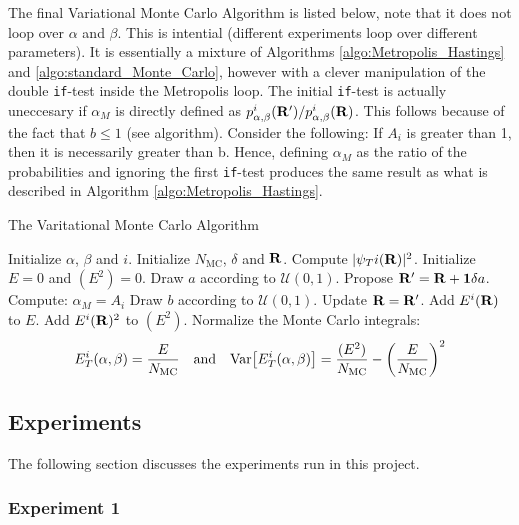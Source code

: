 \documentclass[nofootinbib,reprint,english]{revtex4-1}
\begin{document}
The final Variational Monte Carlo Algorithm is listed below, note that it does not loop over \(\alpha\) and \(\beta\). This is intential (different experiments loop over different parameters). It is essentially a mixture of Algorithms \ref{algo:Metropolis_Hastings} and \ref{algo:standard_Monte_Carlo}, however with a clever manipulation of the double \texttt{if}-test inside the Metropolis loop. The initial \texttt{if}-test is actually uneccesary if \(\alpha_M\) is directly defined as \(p_{\alpha,\beta}^i(\vb{R}')/p_{\alpha,\beta}^i(\vb{R})\). This follows because of the fact that \(b\leq1\) (see algorithm). Consider the following: If \(A_i\) is greater than 1, then it is necessarily greater than b. Hence, defining \(\alpha_M\) as the ratio of the probabilities and ignoring the first \texttt{if}-test produces the same result as what is described in Algorithm \ref{algo:Metropolis_Hastings}.

\begin{algorithm}[H]
\caption{The Varitational Monte Carlo Algorithm}\label{algo:Metropolis_Hastings}
\begin{algorithmic}[1]
\State Initialize \(\alpha\), \(\beta\) and \(i\).
\State Initialize \(N_\text{MC}\), \(\delta\) and \(\vb{R}\).
\State Compute \(|\psi_T i(\vb{R})|^2\).
\State Initialize \(E=0\) and \((E^2)=0\).
	\State Draw \(a\) according to \(\mathcal{U}(0,1)\).
	\State Propose \(\vb{R}'=\vb{R}+\vb{1}\delta a\).
	\State Compute: \(\alpha_M=A_i\)
	\State Draw \(b\) according to \(\mathcal{U}(0,1)\).
		\State Update \(\vb{R}=\vb{R}'\).
	\EndIf
	\State Add \(E^i(\vb{R})\) to \(E\).
	\State Add \(E^i(\vb{R})^2\) to \((E^2)\).
\EndFor
\State Normalize the Monte Carlo integrals:
\[E_T^i(\alpha,\beta)=\frac{E}{N_\text{MC}}\qand \text{Var}\big[E_T^i(\alpha,\beta)\big]=\frac{(E^2)}{N_\text{MC}}-\bigg(\frac{E}{N_\text{MC}}\bigg)^2\]
\end{algorithmic}
\end{algorithm}

\subsection{Experiments}
The following section discusses the experiments run in this project.
\subsubsection{Experiment 1}
\end{document}
